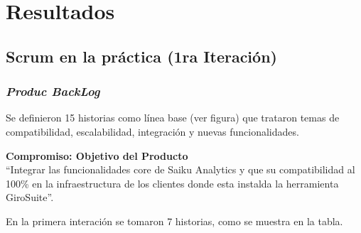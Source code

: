 \chapter{Resultados} \label{chapter:III}
\section{Scrum en la pr\'{a}ctica (1ra Iteraci\'{o}n)}
\begin{spacing}{1.5}
	\subsection{\textit{Produc BackLog}}
	Se definieron 15 historias como l\'{i}nea base (ver figura) que trataron temas de compatibilidad, escalabilidad, integraci\'{o}n y nuevas funcionalidades.
	
	\textbf{Compromiso: Objetivo del Producto}\\
	``Integrar las funcionalidades core de Saiku Analytics y que su compatibilidad al 100\% en la infraestructura de los clientes donde esta instalda la herramienta GiroSuite''.
	
	En la primera interaci\'{o}n se tomaron 7 historias, como se muestra en la tabla. 
	

\end{spacing}
